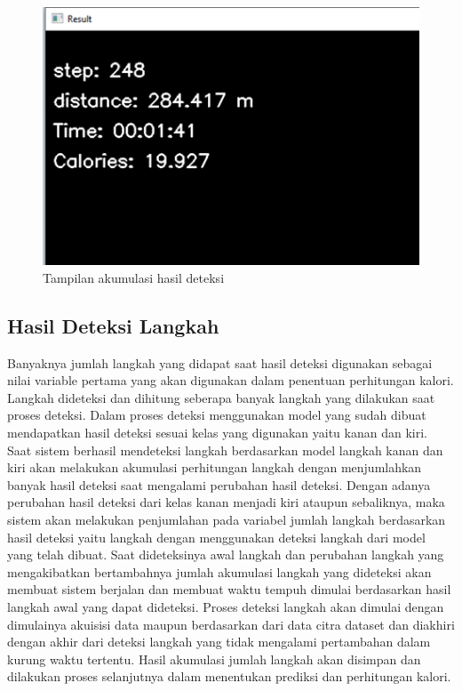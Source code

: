 \begin{figure}[H]
  \centering
  \includegraphics[scale=0.8]{gambar/hasil deteksi2.png}
  \caption{Tampilan akumulasi hasil deteksi}
  \label{fig:HasilDeteksi2}
\end{figure}

\subsection{Hasil Deteksi Langkah}
\label{subsec:HasilLangkah}

Banyaknya jumlah langkah yang didapat saat hasil deteksi digunakan sebagai nilai variable pertama yang akan digunakan dalam penentuan perhitungan kalori. Langkah dideteksi dan dihitung seberapa banyak langkah yang dilakukan saat proses deteksi. Dalam proses deteksi menggunakan model yang sudah dibuat mendapatkan hasil deteksi sesuai kelas yang digunakan yaitu kanan dan kiri. Saat sistem berhasil mendeteksi langkah berdasarkan model langkah kanan dan kiri akan melakukan akumulasi perhitungan langkah dengan menjumlahkan banyak hasil deteksi saat mengalami perubahan hasil deteksi. Dengan adanya perubahan hasil deteksi dari kelas kanan menjadi kiri ataupun sebaliknya, maka sistem akan melakukan penjumlahan pada variabel jumlah langkah berdasarkan hasil deteksi yaitu langkah dengan menggunakan deteksi langkah dari model yang telah dibuat. Saat dideteksinya awal langkah dan perubahan langkah yang mengakibatkan bertambahnya jumlah akumulasi langkah yang dideteksi akan membuat sistem berjalan dan membuat waktu tempuh dimulai berdasarkan hasil langkah awal yang dapat dideteksi. Proses deteksi langkah akan dimulai dengan dimulainya akuisisi data maupun berdasarkan dari data citra dataset dan diakhiri dengan akhir dari deteksi langkah yang tidak mengalami pertambahan dalam kurung waktu tertentu. Hasil akumulasi jumlah langkah akan disimpan dan dilakukan proses selanjutnya dalam menentukan prediksi dan perhitungan kalori.

